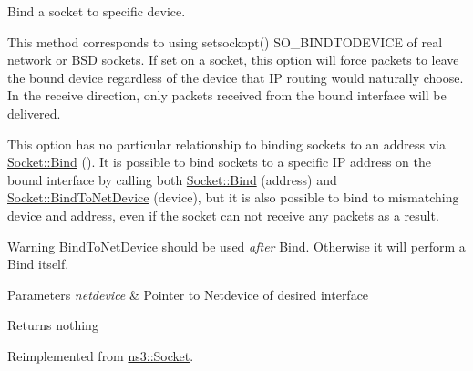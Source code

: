 Bind a socket to specific device. 

This method corresponds to using setsockopt() S\+O\+\_\+\+B\+I\+N\+D\+T\+O\+D\+E\+V\+I\+CE of real network or B\+SD sockets. If set on a socket, this option will force packets to leave the bound device regardless of the device that IP routing would naturally choose. In the receive direction, only packets received from the bound interface will be delivered.

This option has no particular relationship to binding sockets to an address via \hyperlink{classns3_1_1Socket_ada93439a43de2028b5a8fc6621dad482}{Socket\+::\+Bind} (). It is possible to bind sockets to a specific IP address on the bound interface by calling both \hyperlink{classns3_1_1Socket_ada93439a43de2028b5a8fc6621dad482}{Socket\+::\+Bind} (address) and \hyperlink{classns3_1_1Socket_a9952cd10a2c8c108846027108cc9e44e}{Socket\+::\+Bind\+To\+Net\+Device} (device), but it is also possible to bind to mismatching device and address, even if the socket can not receive any packets as a result.

\begin{DoxyWarning}{Warning}
Bind\+To\+Net\+Device should be used {\itshape after} Bind. Otherwise it will perform a Bind itself.
\end{DoxyWarning}

\begin{DoxyParams}{Parameters}
{\em netdevice} & Pointer to Netdevice of desired interface \\
\hline
\end{DoxyParams}
\begin{DoxyReturn}{Returns}
nothing 
\end{DoxyReturn}


Reimplemented from \hyperlink{classns3_1_1Socket_a9952cd10a2c8c108846027108cc9e44e}{ns3\+::\+Socket}.


